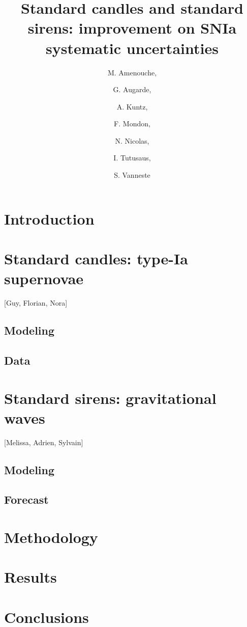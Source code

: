 \documentclass[a4paper,11pt]{article}
\title{\boldmath Standard candles and standard sirens: improvement on SNIa
systematic uncertainties}
\author[a]{M. Amenouche,}
\author[b]{G. Augarde,}
\author[c]{A. Kuntz,}
\author[d]{F. Mondon,}
\author[e]{N. Nicolas,}
\author[f]{I. Tutusaus,}
\author[g]{S. Vanneste}
\affiliation[a]{One University,\\some-street, Country}
\begin{document}
\maketitle
\flushbottom

\section{Introduction}
\label{sec:intro}


\section{Standard candles: type-Ia supernovae}
[Guy, Florian, Nora]

\subsection{Modeling}

\subsection{Data}


\section{Standard sirens: gravitational waves}
[Melissa, Adrien, Sylvain]

\subsection{Modeling}

\subsection{Forecast}

\section{Methodology}

\section{Results}

\section{Conclusions}

\end{document}
